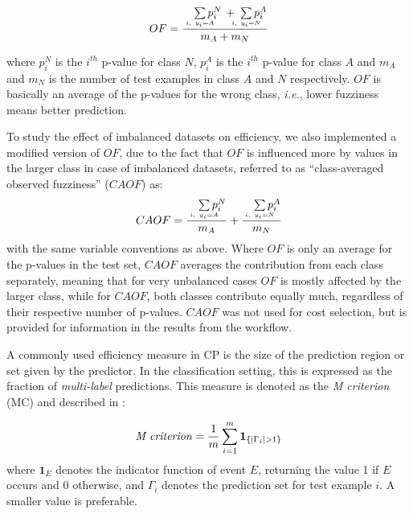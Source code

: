 \documentclass[utf8]{frontiersSCNS} %
\begin{document}
\begin{equation}
OF =  \frac
        {\quad\sum\limits_{\mathclap{\substack{\scriptscriptstyle i,\ y_i=A}}}p_i^N \, + \;\sum\limits_{\mathclap{\substack{\scriptscriptstyle i,\ y_i=N}}}p_i^A}
        {m_A + m_N}
\end{equation}

where $p_i^N$ is the $i^{th}$ p-value for class $N$, $p_i^A$ is the $i^{th}$
p-value for class $A$ and $m_A$ and $m_N$ is the number of test examples in
class $A$ and $N$ respectively. $OF$ is basically an average of the p-values for
the wrong class, \textit{i.e.}, lower fuzziness means better prediction.

To study the effect of imbalanced datasets on efficiency, we also implemented a
modified version of $OF$, due to the fact that $OF$ is influenced more
by values in the larger class in case of imbalanced datasets, referred to as
``class-averaged
observed fuzziness'' ($CAOF$) as:
\begin{equation}
CAOF = \frac
        {\quad\sum\limits_{\mathclap{\substack{\scriptscriptstyle i,\ y_i=A}}}p_i^N}
        {m_A}
       + \frac
        {\quad\sum\limits_{\mathclap{\substack{\scriptscriptstyle i,\ y_i=N}}}p_i^A}
        {m_N}
\end{equation}
with the same variable conventions as above. Where $OF$ is only an average for
the p-values in the test set, $CAOF$ averages the contribution from each class
separately, meaning that for very unbalanced cases $OF$ is mostly affected by
the larger class, while for $CAOF$, both classes contribute equally much,
regardless of their respective number of p-values.
%
%
%
$CAOF$ was not used for cost selection, but is provided for information in the
results from the workflow.

A commonly used efficiency measure in CP is the size of the prediction region or set 
given by the predictor. In the classification setting, this is expressed as the fraction of
\textit{multi-label} predictions. This measure is denoted as the \textit{M criterion} (MC) and described
in \cite{Vovk2016}:

\begin{equation}
\text{\textit{M criterion}} = \frac{ 1}{m} \sum\limits_{i=1}^{m}  \boldsymbol{1}_{\{|\Gamma_i|>1\}}	
\end{equation}
where $\boldsymbol{1}_E$ denotes the indicator function of event $E$, returning the 
value 1 if $E$ occurs and 0 otherwise, and $\Gamma_i$ denotes the prediction set 
for test example $i$.  A smaller value is preferable. 
\end{document}
